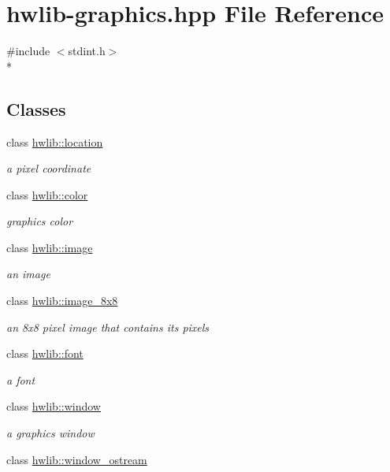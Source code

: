 \hypertarget{hwlib-graphics_8hpp}{}\section{hwlib-\/graphics.hpp File Reference}
\label{hwlib-graphics_8hpp}
{\ttfamily \#include $<$stdint.\+h$>$}\\*
\subsection*{Classes}
\begin{DoxyCompactItemize}
\item 
class \hyperlink{classhwlib_1_1location}{hwlib\+::location}
\begin{DoxyCompactList}\small\item\em a pixel coordinate \end{DoxyCompactList}\item 
class \hyperlink{classhwlib_1_1color}{hwlib\+::color}
\begin{DoxyCompactList}\small\item\em graphics color \end{DoxyCompactList}\item 
class \hyperlink{classhwlib_1_1image}{hwlib\+::image}
\begin{DoxyCompactList}\small\item\em an image \end{DoxyCompactList}\item 
class \hyperlink{classhwlib_1_1image__8x8}{hwlib\+::image\+\_\+8x8}
\begin{DoxyCompactList}\small\item\em an 8x8 pixel image that contains its pixels \end{DoxyCompactList}\item 
class \hyperlink{classhwlib_1_1font}{hwlib\+::font}
\begin{DoxyCompactList}\small\item\em a font \end{DoxyCompactList}\item 
class \hyperlink{classhwlib_1_1window}{hwlib\+::window}
\begin{DoxyCompactList}\small\item\em a graphics window \end{DoxyCompactList}\item 
class \hyperlink{classhwlib_1_1window__ostream}{hwlib\+::window\+\_\+ostream}
\item 

\end{DoxyCompactItemize}
